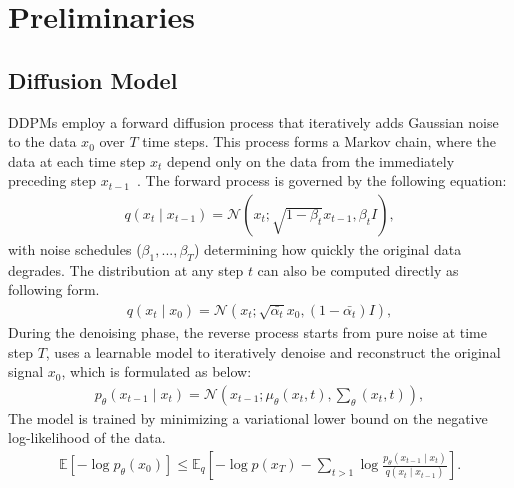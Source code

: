 \section{Preliminaries}


\subsection{Diffusion Model}
\label{sec:pre_diffusion_model}

DDPMs employ a forward diffusion process that iteratively adds Gaussian noise to the data \( x_0 \) over \( T \) time steps. This process forms a Markov chain, where the data at each time step \( x_t \) depend only on the data from the immediately preceding step \( x_{t-1} \)~\citep{ho2020denoising}. The forward process is governed by the following equation:
\begin{equation}
\begin{aligned}
q(x_{t}\mid x_{t-1})=\mathcal N(x_{t};\sqrt{1-\beta_{t}}x_{t-1},\beta_{t} I),\nonumber
\end{aligned}
\end{equation}
with noise schedules ($\beta_{1}, ..., \beta_{T} $)  determining how quickly the original data degrades. The distribution at any step  $t$ can also be computed directly as following form.
\begin{equation}
\begin{aligned}
q(x_{t}\mid x_{0}) = \mathcal N (x_{t};\sqrt{ \bar{\alpha_{t}}}x_{0},(1- \bar{\alpha_{t}})I),\nonumber
\end{aligned}
\end{equation}
During the denoising phase, the reverse process  starts from pure noise at time step  $T$, uses a learnable model to iteratively denoise and reconstruct the original signal $x_{0}$, which is formulated as below:
\begin{equation}
\begin{aligned}
p_{\theta } (x_{t-1} \mid x_{t}) = \mathcal N (x_{t-1}; \mu_{\theta }  (x_{t}, t),  {\textstyle \sum_{\theta}} (x_{t},t)),\nonumber
\end{aligned}
\end{equation}
The model is trained by minimizing a variational lower bound on the negative log-likelihood of the data.
{\small
\begin{equation}
\begin{aligned}
\mathbb {E}[-\log p_{\theta }(x_{0})] \le  \mathbb{E}_{q}\left[ -\log p(x_{T})-\sum_{ t>1}\log \frac{p_{\theta}(x_{t-1}\mid x_{t})}{q(x_{t}\mid x_{t-1})}   \right]. \nonumber
\end{aligned}
\end{equation}
}

